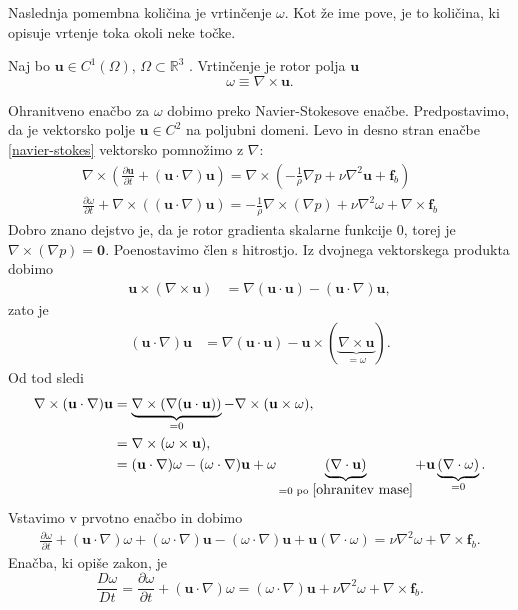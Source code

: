 \documentclass[mat2, tisk]{fmfdelo}
\newcommand{\R}{\mathbb R}
\newcommand{\bd}{\textbf}
\begin{document}
Naslednja pomembna količina je vrtinčenje \bd{$\omega$}. Kot že ime pove, je to količina, ki opisuje vrtenje toka okoli neke točke. 
\begin{definicija}
Naj bo $\bd{u} \in C^1(\Omega)$, $\Omega \subset \R^3$ . Vrtinčenje \bd{\text{$\omega$}} je rotor polja $\bd{u}$
\begin{equation*}
\bd{$\omega$} \equiv \nabla \times \bd{u}.
\end{equation*}
\end{definicija}
Ohranitveno enačbo za \bd{$\omega$} dobimo preko Navier-Stokesove enačbe. Predpostavimo, 
da je vektorsko polje $\bd{u} \in C^2$ na poljubni domeni. Levo in desno stran enačbe \ref{navier-stokes} vektorsko pomnožimo z $\nabla$:
\begin{align*}
\nabla \times (\frac{\partial \bd{u}}{\partial t} + (\bd{u}\cdot \nabla)\bd{u}) = \nabla\times (- \frac{1}{\rho}\nabla p + \nu \nabla^2 \bd{u} + \bd{f}_b) \\
\frac{\partial \bd{$\omega$}}{\partial t} + \nabla \times ((\bd{u}\cdot \nabla)\bd{u}) = - \frac{1}{\rho} \nabla \times (\nabla p) + \nu\nabla^2 \bd{$\omega$} + \nabla \times \bd{f}_b
\end{align*}
Dobro znano dejstvo je, da je rotor gradienta skalarne funkcije $0$, torej je 
$\nabla \times (\nabla p) = \bd{0}$. Poenostavimo člen s hitrostjo. Iz dvojnega vektorskega produkta dobimo 
\begin{align*}
\bd{u} \times (\nabla \times \bd{u}) &=  \nabla(\bd{u}\cdot \bd{u}) - (\bd{u}\cdot \nabla)\bd{u},
\end{align*}
zato je 
\begin{align*}
(\bd{u}\cdot \nabla)\bd{u} &= \nabla (\bd{u}\cdot \bd{u}) - \bd{u}\times (\underbrace{\nabla \times \bd{u}}_{= \bd{$\omega$}}).
\end{align*}
Od tod sledi
\begin{align*}
\nabla \times (\bd{u}\cdot \nabla)\bd{u} &= \underbrace{\nabla \times (\nabla(\bd{u}\cdot \bd{u}))}_{= 0} - \nabla \times (\bd{u} \times \bd{$\omega$}), \\
&= \nabla \times (\bd{$\omega$} \times \bd{u}), \\
&= (\bd{u}\cdot \nabla)\bd{$\omega$} - (\bd{$\omega$} \cdot \nabla)\bd{u} + \bd{$\omega$}\underbrace{(\nabla \cdot \bd{u})}_{= 0 \text{ po } \eqref{ohranitev mase}} + \bd{u} \underbrace{(\nabla \cdot \bd{$\omega$})}_{= 0}.
\end{align*}
Vstavimo v prvotno enačbo in dobimo
\begin{align*}
\frac{\partial \bd{$\omega$}}{\partial t} + (\bd{u}\cdot \nabla)\bd{$\omega$} + (\bd{$\omega$} \cdot \nabla)\bd{u} - (\bd{$\omega$} \cdot \nabla)\bd{u} + \bd{u} (\nabla \cdot \bd{$\omega$}) =  \nu\nabla^2 \bd{$\omega$} + \nabla \times \bd{f}_b.
\end{align*}
Enačba, ki opiše zakon, je
\begin{equation*}
\frac{D\bd{$\omega$}}{D t} = \frac{\partial \bd{$\omega$}}{\partial t} + (\bd{u}\cdot \nabla)\bd{$\omega$} = (\bd{$\omega$} \cdot \nabla)\bd{u}+ \nu \nabla^2 \bd{$\omega$} + \nabla \times \bd{f}_b.
\end{equation*}
\end{document}
